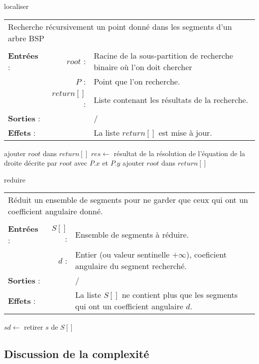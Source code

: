 \documentclass[10pt]{article}
\begin{document}
\begin{algorithm}[!h]
\caption{localiser}
\begin{tabular}{lrl}
\multicolumn{3}{l}{Recherche récursivement un point donné dans les segments d'un arbre BSP}\\
&&\\
\textbf{Entrées} : &$root$ : &Racine de la sous-partition de recherche binaire où l'on doit chercher\\
&$P$ :&Point que l'on recherche.\\
&$return[]$ :&Liste contenant les résultats de la recherche.\\
\textbf{Sorties} :& &/\\
\textbf{Effets} :& &La liste $return[]$ est mise à jour.
\end{tabular}
\begin{algorithmic}[1]
\State ajouter $root$ dans $return[]$
\EndIf
\Else
\State $res\gets$ résultat de la résolution de l'équation de la droite décrite par $root$ avec $P.x$ et $P.y$ 
\State {}
\State {}
\Else
{}
\State ajouter $root$ dans $return[]$
\EndIf
\State{}
\State{}
\EndIf
\EndIf
\EndProcedure
\end{algorithmic}
\end{algorithm}
\begin{algorithm}
\caption{reduire}
\begin{tabular}{lrl}
\multicolumn{3}{l}{Réduit un ensemble de segments pour ne garder que ceux qui ont un coefficient angulaire donné.}\\
&&\\
\textbf{Entrées} : &$S[]$ : &Ensemble de segments à réduire.\\
& $d$ : &Entier (ou valeur sentinelle $+\infty$), coeficient angulaire du segment recherché.\\
\textbf{Sorties} :& &/\\
\textbf{Effets} :& &La liste $S[]$ ne contient plus que les segments qui ont un coefficient angulaire $d$.
\end{tabular}
\begin{algorithmic}[1]
\State $sd\gets$
\State retirer $s$ de $S[]$
\EndIf
\EndFor
\EndProcedure
\end{algorithmic}
\end{algorithm}
\newpage

\subsection{Discussion de la complexité}
\end{document}
